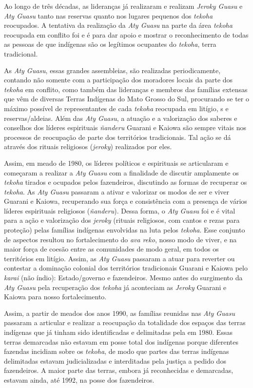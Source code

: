 Ao longo de três décadas, as lideranças já realizaram e realizam \emph{Jeroky
Guasu} e \emph{Aty Guasu} tanto nas reservas quanto nos lugares pequenos dos
\emph{tekoha} reocupados. A tentativa da realização da \emph{Aty Guasu} na parte da
área \emph{tekoha} reocupada em conflito foi e é para dar apoio e mostrar o
reconhecimento de todas as pessoas de que indígenas são os legítimos
ocupantes do \emph{tekoha}, terra tradicional. 

As \emph{Aty Guasu}, essas grandes assembleias, são realizadas periodicamente,
contando não somente com a participação dos moradores locais da parte
dos \emph{tekoha} em conflito, como também das lideranças e membros das
famílias extensas que vêm de diversas Terras Indígenas do Mato Grosso
do Sul, procurando se ter o máximo possível de representantes de cada
\emph{tekoha} reocupada em litígio,  s e reservas/aldeias. Além das \emph{Aty
Guasu}, a atuação e a valorização dos saberes e conselhos dos líderes
espirituais \emph{ñanderu} Guarani e Kaiowa são sempre vitais nos processos de
reocupação de parte dos territórios tradicionais. Tal ação se dá
através dos rituais religiosos (\emph{jeroky}) realizados por eles.

Assim, em meado de 1980, os líderes políticos e espirituais se
articularam e começaram a realizar a \emph{Aty Guasu} com a finalidade de
discutir amplamente os \emph{tekoha} tirados e ocupados pelos fazendeiros,
discutindo as formas de recuperar os \emph{tekoha}. As \emph{Aty Guasu} passaram a
ativar e valorizar os modos de ser e viver Guarani e Kaiowa,
recuperando sua força e consistência com a presença de vários líderes
espirituais religiosos (\emph{ñanderu}). Dessa forma, o \emph{Aty Guasu} foi e é
vital para a ação e valorização dos \emph{jeroky} (rituais religiosos, com
cantos e rezas para proteção) pelas famílias indígenas  envolvidas na
luta pelos \emph{tekoha}. Esse conjunto de aspectos resultou no fortalecimento
do \emph{ava reko}, nosso modo de viver, e na maior força de coesão entre as
comunidades de modo geral, em todos os territórios em litígio. Assim,
as \emph{Aty Guasu} passaram a atuar para reverter ou contestar a dominação
colonial dos territórios tradicionais Guarani e Kaiowa pelo \emph{karai} (não
índio): Estado/governo e fazendeiros. Mesmo antes do surgimento da \emph{Aty
Guasu} pela recuperação dos \emph{tekoha} já aconteciam as \emph{Jeroky} Guarani e
Kaiowa para nosso fortalecimento.

Assim, a partir de meados dos anos 1990, as famílias reunidas nas \emph{Aty
Guasu} passaram a articular e realizar a reocupação da totalidade dos
espaços das terras indígenas que já tinham sido identificadas e
delimitadas pela  em 1980. Essas terras demarcadas não estavam em
posse total dos indígenas porque diferentes fazendas incidiam sobre os
\emph{tekoha}, de modo que partes das terras indígenas delimitadas estavam
judicializadas e interditadas pela justiça a pedido dos fazendeiros. A
maior parte das terras, embora já reconhecidas e demarcadas, estavam
ainda, até 1992, na posse dos fazendeiros. 

